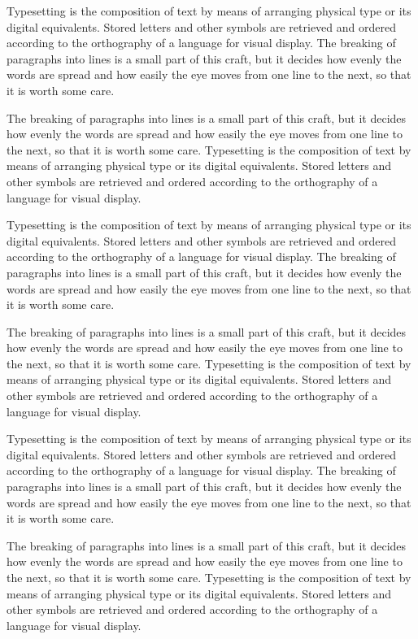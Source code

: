 \documentclass[parskip=half]{scrartcl}
\begin{document}
Typesetting is the composition of text by means of arranging physical type or its digital equivalents. Stored letters and other symbols are retrieved and ordered according to the orthography of a language for visual display. The breaking of paragraphs into lines is a small part of this craft, but it decides how evenly the words are spread and how easily the eye moves from one line to the next, so that it is worth some care.

The breaking of paragraphs into lines is a small part of this craft, but it decides how evenly the words are spread and how easily the eye moves from one line to the next, so that it is worth some care. Typesetting is the composition of text by means of arranging physical type or its digital equivalents. Stored letters and other symbols are retrieved and ordered according to the orthography of a language for visual display.

Typesetting is the composition of text by means of arranging physical type or its digital equivalents. Stored letters and other symbols are retrieved and ordered according to the orthography of a language for visual display. The breaking of paragraphs into lines is a small part of this craft, but it decides how evenly the words are spread and how easily the eye moves from one line to the next, so that it is worth some care.

The breaking of paragraphs into lines is a small part of this craft, but it decides how evenly the words are spread and how easily the eye moves from one line to the next, so that it is worth some care. Typesetting is the composition of text by means of arranging physical type or its digital equivalents. Stored letters and other symbols are retrieved and ordered according to the orthography of a language for visual display.

Typesetting is the composition of text by means of arranging physical type or its digital equivalents. Stored letters and other symbols are retrieved and ordered according to the orthography of a language for visual display. The breaking of paragraphs into lines is a small part of this craft, but it decides how evenly the words are spread and how easily the eye moves from one line to the next, so that it is worth some care.

The breaking of paragraphs into lines is a small part of this craft, but it decides how evenly the words are spread and how easily the eye moves from one line to the next, so that it is worth some care. Typesetting is the composition of text by means of arranging physical type or its digital equivalents. Stored letters and other symbols are retrieved and ordered according to the orthography of a language for visual display.
\end{document}
